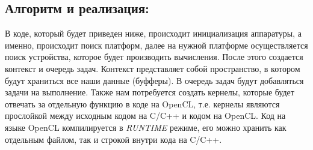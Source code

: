 \documentclass[utf8, 12pt, a4paper, oneside]{article}
\begin{document}
\subsection*{Алгоритм и реализация:}
В коде, который будет приведен ниже, происходит инициализация аппаратуры, а именно, происходит поиск платформ, далее на нужной платформе осуществляется поиск устройства, которое будет производить вычисления. После этого создается контекст и очередь задач. Контекст представляет собой пространство, в котором будут храниться все наши данные (буфферы). В очередь задач будут добавляться задачи на выполнение. Также нам потребуется создать кернелы, которые будет отвечать за отдельную функцию в коде на OpenCL, т.е. кернелы являются прослойкой между исходным кодом на C/C++ и кодом на OpenCL. Код на языке OpenCL компилируется в \textit{RUNTIME} режиме, его можно хранить как отдельным файлом, так и строкой внутри кода на C/C++.
\end{document}
